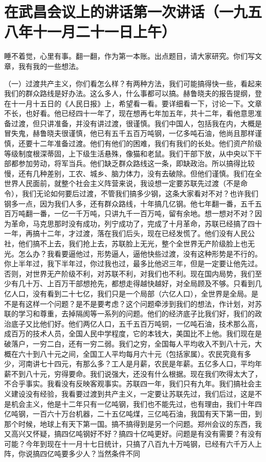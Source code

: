 \section[在武昌会议上的讲话第一次讲话（一九五八年十一月二十一日上午）]{在武昌会议上的讲话第一次讲话（一九五八年十一月二十一日上午）}


睡不着觉，心里有事。翻一翻，作为第一本账。出点题目，请大家研究。你们写文章，我有我的一些想法。

（一）过渡共产主义，你们看怎么样？有两种方法，我们可能搞得快一些，看起来我们的群众路线是好办法。这么多人，什么事都可以搞。赫鲁晓夫的报告提纲，登在十一月十五日的《人民日报》上，希望看一看。要详细看一下，讨论一下。文章不长，也好看。他已经四十一年了，现在想再七年加五年，共十二年，看他意思准备过渡，但只讲准备，并没有讲过渡，很谨慎。我们中国人，包括我在内，大概是冒失鬼，赫鲁晓夫很谨慎，他已有五千五百万吨钢，一亿多吨石油，他尚且那样谨慎，还要十二年准备过渡。他们有他们的困难，我们有我们的长处。他们资产阶级等级制度根深蒂固，上下级生活悬殊，像猫和老鼠。我们干部下放，从中央以下干部都参加劳动，将军当兵。他们缺乏群众路线这一条，即缺政治。所以搞得比较慢，还有几种差别，工农、城乡、脑力体力，没有去破除。但他们谨慎。我们在全世界人民面前，就整个社会主义阵营来说，我设想一定要苏联先过渡（不是命令），我们无论如何要后过渡，不管我们搞多少钢，这条大家看对不对？也许我们钢多一点，因为我们人多，还有群众路线，十年搞几亿钢。他七年翻一番，五千五百万吨翻一番，一亿一千万吨，只讲九千一百万吨，留有余地。想一想对不对？因为革命，马克思那时没有成功，列宁成功了，完成了十月革命，苏联已经搞了四十一年，再搞十二年，才过渡，落在我们后头，现在已经发慌了。他们没有人民公社，他们搞不上去，我们抢上去，苏联脸上无光，整个全世界无产阶级脸上也无光。怎么办？我看要逼他过，形势逼人，逼他快些过渡，没有这种形势是不行的。你上半年过，我下半年过，你过我也过，最多比他迟三年，但是一定要让他先过。否则，对世界无产阶级不利，对苏联不利，对我们也不利。现在国内局势，我们至少有几十万、上百万干部想抢先，都想走得越快越好，对全局顾及不够。只看到几亿人口，没有看到二十七亿，我们只是一个局部（六亿人口），全世界是全局。是不是有这样一个问题？是不是要考虑？这个问题牵涉到我们的想法，作计划，对苏联的学习和尊重，去掉隔阂等一系列的问题。他们的经济底子比我们好，我们的政治底子又比他们好。他们两亿人口，五千五百万吨铜，一亿吨石油，技术那么高，成百万的技术人员，全国人民中学程度，它的本钱大，美国比不上他。我们现在是破落户，一穷二白，还有一穷二弱。我们之穷，全国每人平均收入不到八十元，大概在六十到八十元之间，全国工人平均每月六十元（包括家属）。农民究竟有多少，河南讲七十四元，有那么多？工人是月薪，农民是年薪。五亿多人口，平均年薪不到八十元，穷得要命。我们说强大，还没有什么根据。现在我们吹得太大了，不合乎事实。我看没有反映客观事实。苏联四一年，我们只有九年。我们搞社会主义建设没有经验，我看要过渡到共产主义，一定要让苏联先过，我们后过，这是不是机会主义，他是十二年只有一亿吨钢，我们也不能先过，也有理由，我们十年四亿吨钢，一百六十万台机器，二十五亿吨煤，三亿吨石油，我国有天下第一田，到那个时候，地球上有天下第一国。搞不搞得到是另一个问题。郑州会议的东西，我又高兴又怀疑，搞四亿吨钢好不好？搞四十亿吨更好。问题是有没有需要？有没有可能？今年到现在十一月十七日统计，只搞了八百九十万吨钢，已经有六千万人上阵，你说搞四亿吨要多少人？当然条件不同